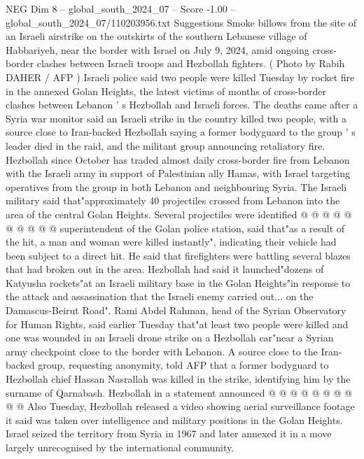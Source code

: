 \begin{textsample}{NEG Dim 8 – global\_south\_2024\_07 – Score -1.00 – global\_south\_2024\_07/110203956.txt}  \label{ex:f8_neg_113}
Suggestions Smoke billows from the site of an Israeli airstrike on the outskirts of the southern Lebanese village of Habbariyeh, near the border with Israel on July 9, 2024, amid ongoing cross-border clashes between Israeli troops and Hezbollah fighters. ( Photo by Rabih DAHER / AFP ) Israeli police said two people were killed Tuesday by rocket fire in the annexed Golan Heights, the latest victims of months of cross-border clashes between Lebanon ' s Hezbollah and Israeli forces.
The deaths came after a Syria war monitor said an Israeli strike in the country killed two people, with a source close to Iran-backed Hezbollah saying a former bodyguard to the group ' s leader died in the raid, and the militant group announcing retaliatory fire.
Hezbollah since October has traded almost daily cross-border fire from Lebanon with the Israeli army in support of Palestinian ally Hamas, with Israel targeting operatives from the group in both Lebanon and neighbouring Syria.
The Israeli military said that"approximately 40 projectiles crossed from Lebanon into the area of the central Golan Heights.
Several projectiles were identified @ @ @ @ @ @ @ @ @ @ superintendent of the Golan police station, said that"as a result of the hit, a man and woman were killed instantly", indicating their vehicle had been subject to a direct hit.
He said that firefighters were battling several blazes that had broken out in the area.
Hezbollah had said it launched"dozens of Katyusha rockets"at an Israeli military base in the Golan Heights"in response to the attack and assassination that the Israeli enemy carried out... on the Damascus-Beirut Road".
Rami Abdel Rahman, head of the Syrian Observatory for Human Rights, said earlier Tuesday that"at least two people were killed and one was wounded in an Israeli drone strike on a Hezbollah car"near a Syrian army checkpoint close to the border with Lebanon.
A source close to the Iran-backed group, requesting anonymity, told AFP that a former bodyguard to Hezbollah chief Hassan Nasrallah was killed in the strike, identifying him by the surname of Qarnabash.
Hezbollah in a statement announced @ @ @ @ @ @ @ @ @ @ Also Tuesday, Hezbollah released a video showing aerial surveillance footage it said was taken over intelligence and military positions in the Golan Heights.
Israel seized the territory from Syria in 1967 and later annexed it in a move largely unrecognised by the international community.

\end{textsample}
